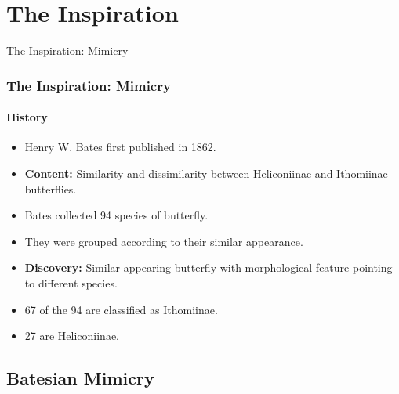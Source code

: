 \section{The Inspiration}

\frame
{
	\begin{center}
		\LARGE The Inspiration: Mimicry
	\end{center}
}

\frame
{
	\frametitle{The Inspiration: Mimicry}
	\framesubtitle{History}
	
	\begin{itemize}
		\item Henry W. Bates first published in 1862.
		\item \textbf{Content:} Similarity and dissimilarity between Heliconiinae and Ithomiinae butterflies. 
		\item Bates collected 94 species of butterfly.
		\item They were grouped according to their similar appearance.
		\item \textbf{Discovery:} Similar appearing butterfly with morphological feature pointing to different species.
		\item 67 of the 94 are classified as Ithomiinae.
		\item 27 are Heliconiinae.
	\end{itemize}
}

\subsection{Batesian Mimicry}

